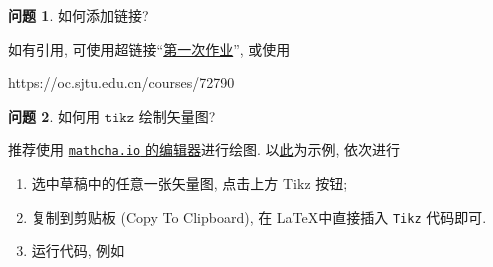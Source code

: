 \documentclass[11pt]{ctexart}
\theoremstyle{definition}
\newtheorem{qqq}{问题}[section]
\numberwithin{equation}{section}
\theoremstyle{definition}
\theoremstyle{remark}
\begin{document}
\begin{qqq}
    如何添加链接?
    \begin{aaa}
        如有引用, 可使用超链接``\href{https://oc.sjtu.edu.cn/courses/72790/assignments/302404}{第一次作业}'', 或使用
        \begin{llll}
            https://oc.sjtu.edu.cn/courses/72790
        \end{llll}
    \end{aaa}
\end{qqq}

\begin{qqq}
    如何用 $\texttt{tikz}$ 绘制矢量图?
    \begin{aaa}
        推荐使用 \href{https://www.mathcha.io/editor}{\texttt{mathcha.io} 的编辑器}进行绘图. 以\href{https://www.mathcha.io/editor/Gjoo6IZYtkXHB3t5MkKrxFQ6yowKfqkok8PUd8w7O}{此}为示例, 依次进行
        \begin{enumerate}
            \item 选中草稿中的任意一张矢量图, 点击上方 \textsf{Tikz} 按钮;
            \item 复制到剪贴板 (\textsf{Copy To Clipboard}), 在 \LaTeX 中直接插入 \texttt{Tikz} 代码即可.
            \item 运行代码, 例如 %
                  \begin{center}
                      \begin{tikzpicture}[x=0.75pt,y=0.75pt,yscale=-1,xscale=1]


\end{tikzpicture}
\end{center}
\end{enumerate}
\end{aaa}
\end{qqq}
\end{document}
